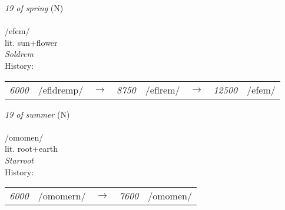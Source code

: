 \vspace{15pt}
\begin{nopagebreak}
 \textit{19 of spring} (N)\\
\\
\noindent /{\textprimstress}efem/\\
\noindent lit. sun+flower\\
\noindent \textit{Soldrem}\\


\noindent History:

\vspace{-0pt}
\hspace{40pt}
\begin{tabular}{ccc}
\textit{6000} & /efldremp/&$\rightarrow$ & \textit{8750} & /eflrem/&$\rightarrow$ & \textit{12500} & /efem/& \\
\end{tabular}

\vspace{20pt}\hline

\end{nopagebreak}
\filbreak



\vspace{15pt}
\begin{nopagebreak}
 \textit{19 of summer} (N)\\
\\
\noindent /{}om{\textprimstress}omen/\\
\noindent lit. root+earth\\
\noindent \textit{Starroot}\\


\noindent History:

\vspace{-0pt}
\hspace{40pt}
\begin{tabular}{ccc}
\textit{6000} & /{}omomern/&$\rightarrow$ & \textit{7600} & /{}omomen/& \\
\end{tabular}

\vspace{20pt}\hline

\end{nopagebreak}
\filbreak



